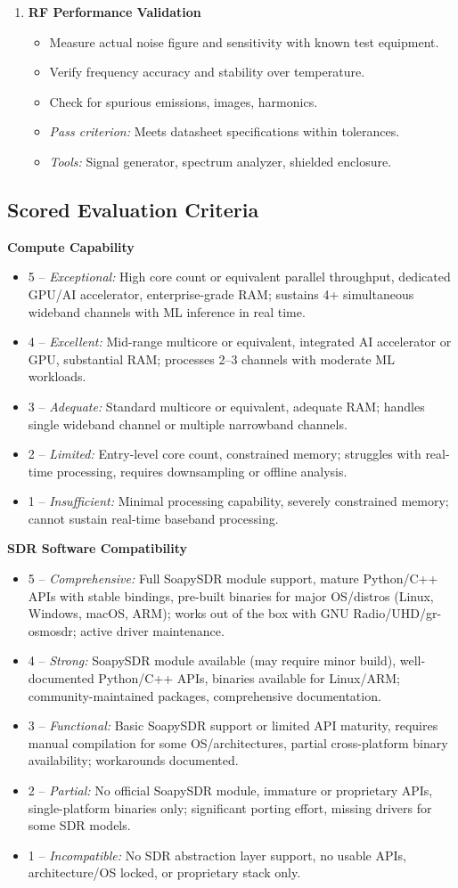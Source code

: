 \documentclass[11pt,a4paper]{article}
\newcommand{\criteriaheading}[1]{\par\smallskip\noindent\textbf{#1}\par}
\newcommand{\scoreitem}[3]{\item #1 -- \textit{#2:} #3}
\begin{document}
\begin{enumerate}
  \item \textbf{RF Performance Validation}
  \begin{itemize}
    \item Measure actual noise figure and sensitivity with known test equipment.
    \item Verify frequency accuracy and stability over temperature.
    \item Check for spurious emissions, images, harmonics.
    \item \textit{Pass criterion:} Meets datasheet specifications within tolerances.
    \item \textit{Tools:} Signal generator, spectrum analyzer, shielded enclosure.
  \end{itemize}
\end{enumerate}

\subsection*{Scored Evaluation Criteria}

\begingroup
\small

\criteriaheading{Compute Capability}
\begin{itemize}
  \scoreitem{5}{Exceptional}{High core count or equivalent parallel throughput, dedicated GPU/AI accelerator, enterprise-grade RAM; sustains 4+ simultaneous wideband channels with ML inference in real time.}
  \scoreitem{4}{Excellent}{Mid-range multicore or equivalent, integrated AI accelerator or GPU, substantial RAM; processes 2--3 channels with moderate ML workloads.}
  \scoreitem{3}{Adequate}{Standard multicore or equivalent, adequate RAM; handles single wideband channel or multiple narrowband channels.}
  \scoreitem{2}{Limited}{Entry-level core count, constrained memory; struggles with real-time processing, requires downsampling or offline analysis.}
  \scoreitem{1}{Insufficient}{Minimal processing capability, severely constrained memory; cannot sustain real-time baseband processing.}
\end{itemize}

\criteriaheading{SDR Software Compatibility}
\begin{itemize}
  \scoreitem{5}{Comprehensive}{Full SoapySDR module support, mature Python/C++ APIs with stable bindings, pre-built binaries for major OS/distros (Linux, Windows, macOS, ARM); works out of the box with GNU Radio/UHD/gr-osmosdr; active driver maintenance.}
  \scoreitem{4}{Strong}{SoapySDR module available (may require minor build), well-documented Python/C++ APIs, binaries available for Linux/ARM; community-maintained packages, comprehensive documentation.}
  \scoreitem{3}{Functional}{Basic SoapySDR support or limited API maturity, requires manual compilation for some OS/architectures, partial cross-platform binary availability; workarounds documented.}
  \scoreitem{2}{Partial}{No official SoapySDR module, immature or proprietary APIs, single-platform binaries only; significant porting effort, missing drivers for some SDR models.}
  \scoreitem{1}{Incompatible}{No SDR abstraction layer support, no usable APIs, architecture/OS locked, or proprietary stack only.}
\end{itemize}
\end{document}
